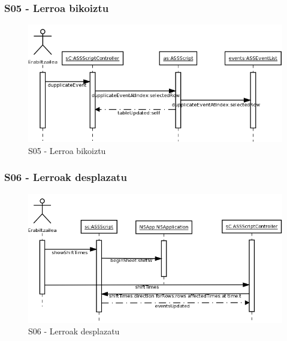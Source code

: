 \subsubsection{S05 - Lerroa bikoiztu}
\begin{figure}[htp]
\begin{center}
\includegraphics[scale=0.35]{Pictures/Chapter4/Diseinua/S05.png}
\caption{S05 - Lerroa bikoiztu}
\label{s05d}
\end{center}
\end{figure}

\newpage
\subsubsection{S06 - Lerroak desplazatu}
\begin{figure}[htp]
\begin{center}
\includegraphics[scale=0.35]{Pictures/Chapter4/Diseinua/S06.png}
\caption{S06 - Lerroak desplazatu}
\label{s06d}
\end{center}
\end{figure}


